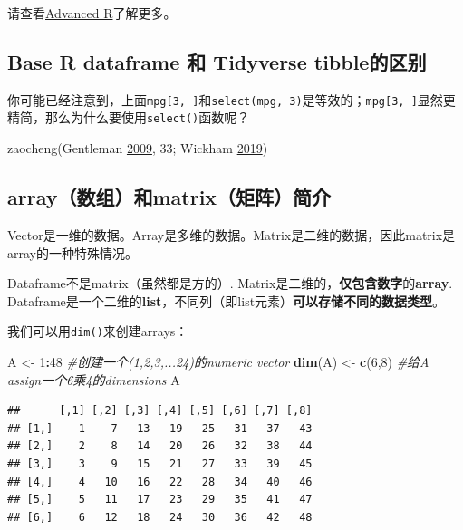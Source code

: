 \documentclass[]{book}
\newenvironment{Shaded}{\begin{snugshade}}{\end{snugshade}}
\newcommand{\CommentTok}[1]{\textcolor[rgb]{0.56,0.35,0.01}{\textit{#1}}}
\newcommand{\DecValTok}[1]{\textcolor[rgb]{0.00,0.00,0.81}{#1}}
\newcommand{\KeywordTok}[1]{\textcolor[rgb]{0.13,0.29,0.53}{\textbf{#1}}}
\newcommand{\NormalTok}[1]{#1}
\newcommand{\OperatorTok}[1]{\textcolor[rgb]{0.81,0.36,0.00}{\textbf{#1}}}
\newcommand{\StringTok}[1]{\textcolor[rgb]{0.31,0.60,0.02}{#1}}
\begin{document}
请查看\href{https://adv-r.hadley.nz/subsetting.html\#simplify-preserve}{Advanced R}了解更多。

\hypertarget{base-r-dataframe--tidyverse-tibble}{%
\subsection{Base R dataframe 和 Tidyverse tibble的区别}\label{base-r-dataframe--tidyverse-tibble}}

你可能已经注意到，上面\texttt{mpg{[}3,\ {]}}和\texttt{select(mpg,\ 3)}是等效的；\texttt{mpg{[}3,\ {]}}显然更精简，那么为什么要使用\texttt{select()}函数呢？

zaocheng(Gentleman \protect\hyperlink{ref-Gentleman2009R-Programming-Bioinfo}{2009}, 33; Wickham \protect\hyperlink{ref-Wickham:2019}{2019})

\hypertarget{arraymatrix}{%
\subsection{array（数组）和matrix（矩阵）简介}\label{arraymatrix}}

Vector是一维的数据。Array是多维的数据。Matrix是二维的数据，因此matrix是array的一种特殊情况。

Dataframe不是matrix（虽然都是方的）. Matrix是二维的，\textbf{仅包含数字}的\textbf{array}. Dataframe是一个二维的\textbf{list}，不同列（即list元素）\textbf{可以存储不同的数据类型}。

我们可以用\texttt{dim()}来创建arrays：

\begin{Shaded}
\begin{Highlighting}[]
\NormalTok{A <-}\StringTok{ }\DecValTok{1}\OperatorTok{:}\DecValTok{48} \CommentTok{#创建一个(1,2,3,...24)的numeric vector}
\KeywordTok{dim}\NormalTok{(A) <-}\StringTok{ }\KeywordTok{c}\NormalTok{(}\DecValTok{6}\NormalTok{,}\DecValTok{8}\NormalTok{) }\CommentTok{#给A assign一个6乘4的dimensions}
\NormalTok{A}
\end{Highlighting}
\end{Shaded}

\begin{verbatim}
##      [,1] [,2] [,3] [,4] [,5] [,6] [,7] [,8]
## [1,]    1    7   13   19   25   31   37   43
## [2,]    2    8   14   20   26   32   38   44
## [3,]    3    9   15   21   27   33   39   45
## [4,]    4   10   16   22   28   34   40   46
## [5,]    5   11   17   23   29   35   41   47
## [6,]    6   12   18   24   30   36   42   48
\end{verbatim}
\end{document}
